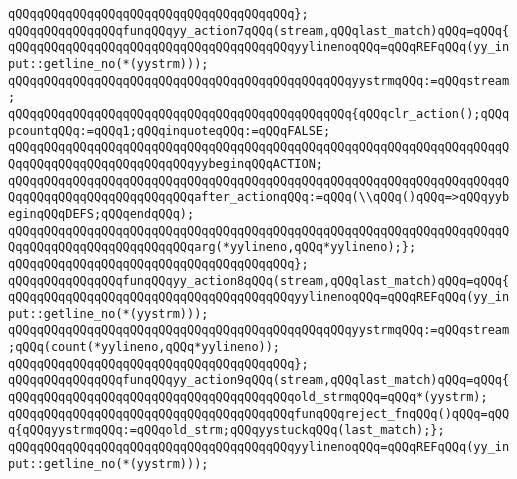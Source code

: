 \verb|qQQqqQQqqQQqqQQqqQQqqQQqqQQqqQQqqQQqqQQq};|\newline
\verb|qQQqqQQqqQQqqQQqfunqQQqyy_action7qQQq(stream,qQQqlast_match)qQQq=qQQq{|\newline
\verb|qQQqqQQqqQQqqQQqqQQqqQQqqQQqqQQqqQQqqQQqyylinenoqQQq=qQQqREFqQQq(yy_input::getline_no(*(yystrm)));|\newline
\newline
\verb|qQQqqQQqqQQqqQQqqQQqqQQqqQQqqQQqqQQqqQQqqQQqqQQqyystrmqQQq:=qQQqstream;|\newline
\verb|qQQqqQQqqQQqqQQqqQQqqQQqqQQqqQQqqQQqqQQqqQQqqQQq{qQQqclr_action();qQQqpcountqQQq:=qQQq1;qQQqinquoteqQQq:=qQQqFALSE;|\newline
\verb|qQQqqQQqqQQqqQQqqQQqqQQqqQQqqQQqqQQqqQQqqQQqqQQqqQQqqQQqqQQqqQQqqQQqqQQqqQQqqQQqqQQqqQQqqQQqqQQqyybeginqQQqACTION;|\newline
\verb|qQQqqQQqqQQqqQQqqQQqqQQqqQQqqQQqqQQqqQQqqQQqqQQqqQQqqQQqqQQqqQQqqQQqqQQqqQQqqQQqqQQqqQQqqQQqqQQqafter_actionqQQq:=qQQq(\\qQQq()qQQq=>qQQqyybeginqQQqDEFS;qQQqendqQQq);|\newline
\verb|qQQqqQQqqQQqqQQqqQQqqQQqqQQqqQQqqQQqqQQqqQQqqQQqqQQqqQQqqQQqqQQqqQQqqQQqqQQqqQQqqQQqqQQqqQQqqQQqarg(*yylineno,qQQq*yylineno);};|\newline
\verb|qQQqqQQqqQQqqQQqqQQqqQQqqQQqqQQqqQQqqQQq};|\newline
\verb|qQQqqQQqqQQqqQQqfunqQQqyy_action8qQQq(stream,qQQqlast_match)qQQq=qQQq{|\newline
\verb|qQQqqQQqqQQqqQQqqQQqqQQqqQQqqQQqqQQqqQQqyylinenoqQQq=qQQqREFqQQq(yy_input::getline_no(*(yystrm)));|\newline
\newline
\verb|qQQqqQQqqQQqqQQqqQQqqQQqqQQqqQQqqQQqqQQqqQQqqQQqyystrmqQQq:=qQQqstream;qQQq(count(*yylineno,qQQq*yylineno));|\newline
\verb|qQQqqQQqqQQqqQQqqQQqqQQqqQQqqQQqqQQqqQQq};|\newline
\verb|qQQqqQQqqQQqqQQqfunqQQqyy_action9qQQq(stream,qQQqlast_match)qQQq=qQQq{|\newline
\verb|qQQqqQQqqQQqqQQqqQQqqQQqqQQqqQQqqQQqqQQqold_strmqQQq=qQQq*(yystrm);|\newline
\verb|qQQqqQQqqQQqqQQqqQQqqQQqqQQqqQQqqQQqqQQqfunqQQqreject_fnqQQq()qQQq=qQQq{qQQqyystrmqQQq:=qQQqold_strm;qQQqyystuckqQQq(last_match);};|\newline
\verb|qQQqqQQqqQQqqQQqqQQqqQQqqQQqqQQqqQQqqQQqyylinenoqQQq=qQQqREFqQQq(yy_input::getline_no(*(yystrm)));|\newline
